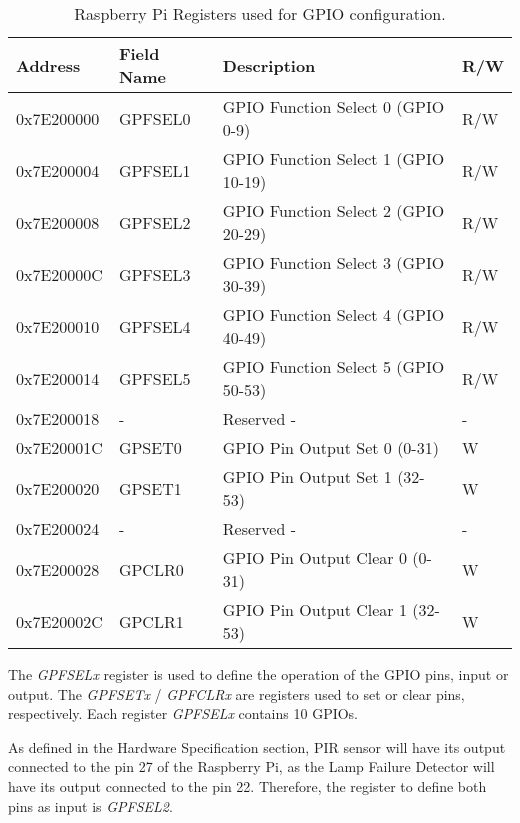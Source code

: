\begin{table}[H]
	\centering
	\resizebox{\columnwidth}{!}
	{
		\begin{tabular}{|m{}|m{}|m{}|m{}|}
			\hline
			\textbf{Address} & \textbf{Field Name} & \textbf{Description} & \textbf{R/W}
			\\\hline\hline
			0x7E200000 & GPFSEL0 & GPIO Function Select 0 (GPIO 0-9) &  R/W
			\\\hline
			
			0x7E200004 & GPFSEL1 & GPIO Function Select 1 (GPIO 10-19) & R/W
			\\\hline
			
			0x7E200008 & GPFSEL2 & GPIO Function Select 2 (GPIO 20-29) & R/W
			\\\hline
			
			0x7E20000C & GPFSEL3 & GPIO Function Select 3 (GPIO 30-39) & R/W
			\\\hline
			
			0x7E200010 & GPFSEL4 & GPIO Function Select 4 (GPIO 40-49) & R/W
			\\\hline
			
			0x7E200014 & GPFSEL5 & GPIO Function Select 5 (GPIO 50-53) & R/W
			\\\hline
			
			0x7E200018 & - & Reserved - & -
			\\\hline
			
			0x7E20001C & GPSET0 & GPIO Pin Output Set 0 (0-31) & W
			\\\hline
			
			0x7E200020 & GPSET1 & GPIO Pin Output Set 1 (32-53) & W
			\\\hline
			
			0x7E200024 & - & Reserved - & -
			\\\hline
			
			0x7E200028 & GPCLR0 & GPIO Pin Output Clear 0 (0-31) & W
			\\\hline
			
			0x7E20002C & GPCLR1 & GPIO Pin Output Clear 1 (32-53) & W
			\\\hline			
		\end{tabular}
	}
	\caption{Raspberry Pi Registers used for GPIO configuration.}
	\label{table:gpio_reg}
\end{table}

The \textit{GPFSELx} register is used to define the operation of the GPIO pins, input or output. The \textit{GPFSETx} / \textit{GPFCLRx} are registers used to set or clear pins, respectively. Each register \textit{GPFSELx} contains 10 GPIOs.

As defined in the Hardware Specification section, PIR sensor will have its output connected to the pin 27 of the Raspberry Pi, as the Lamp Failure Detector will have its output connected to the pin 22. Therefore, the register to define both pins as input is \textit{GPFSEL2}.
